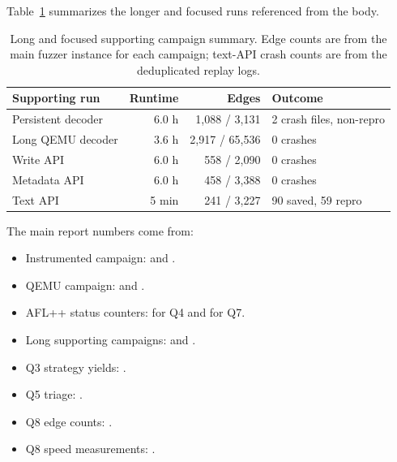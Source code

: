 \documentclass[letterpaper,twocolumn,10pt]{article}
\begin{document}
Table~\ref{tab:supporting-campaigns} summarizes the longer and focused runs
referenced from the body.
\begin{table}[t]
\centering
\small
\begin{tabular}{lrrl}
\toprule
\textbf{Supporting run} & \textbf{Runtime} & \textbf{Edges} & \textbf{Outcome} \\
\midrule
Persistent decoder & 6.0 h & 1{,}088 / 3{,}131 & 2 crash files, non-repro \\
Long QEMU decoder & 3.6 h & 2{,}917 / 65{,}536 & 0 crashes \\
Write API & 6.0 h & 558 / 2{,}090 & 0 crashes \\
Metadata API & 6.0 h & 458 / 3{,}388 & 0 crashes \\
Text API & 5 min & 241 / 3{,}227 & 90 saved, 59 repro \\
\bottomrule
\end{tabular}
\caption{Long and focused supporting campaign summary. Edge counts are from
the main fuzzer instance for each campaign; text-API crash counts are from the
deduplicated replay logs.}
\label{tab:supporting-campaigns}
\end{table}

The main report numbers come from:
\begin{itemize}[leftmargin=*]
  \item Instrumented campaign:  and
  .
  \item QEMU campaign:  and
  .
  \item AFL++ status counters:  for Q4 and
   for Q7.
  \item Long supporting campaigns:  and
  .
  \item Q3 strategy yields: .
  \item Q5 triage: .
  \item Q8 edge counts: .
  \item Q8 speed measurements: .
\end{itemize}
\end{document}
